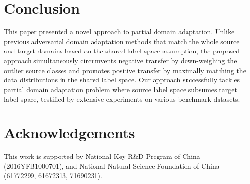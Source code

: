 \documentclass[runningheads]{llncs}
\begin{document}
\section{Conclusion}
This paper presented a novel approach to partial domain adaptation. Unlike previous adversarial domain adaptation methods that match the whole source and target domains based on the shared label space assumption, the proposed approach simultaneously circumvents negative transfer by down-weighing the outlier source classes and promotes positive transfer by maximally matching the data distributions in the shared label space. Our approach successfully tackles partial domain adaptation problem where source label space subsumes target label space, testified by extensive experiments on various benchmark datasets.

\section{Acknowledgements}
This work is supported by National Key R\&D Program of China (2016YFB1000701), and National Natural Science Foundation of China (61772299, 61672313, 71690231).

\clearpage



\end{document}
